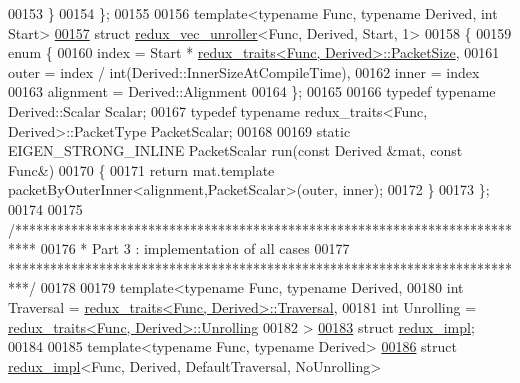 \begin{DoxyCode}
00153   \}
00154 \};
00155 
00156 \textcolor{keyword}{template}<\textcolor{keyword}{typename} Func, \textcolor{keyword}{typename} Derived, \textcolor{keywordtype}{int} Start>
\hyperlink{struct_eigen_1_1internal_1_1redux__vec__unroller_3_01_func_00_01_derived_00_01_start_00_011_01_4}{00157} \textcolor{keyword}{struct }\hyperlink{struct_eigen_1_1internal_1_1redux__vec__unroller}{redux\_vec\_unroller}<Func, Derived, Start, 1>
00158 \{
00159   \textcolor{keyword}{enum} \{
00160     index = Start * \hyperlink{struct_eigen_1_1internal_1_1redux__traits}{redux\_traits<Func, Derived>::PacketSize},
00161     outer = index / int(Derived::InnerSizeAtCompileTime),
00162     inner = index %
00163     alignment = Derived::Alignment
00164   \};
00165 
00166   \textcolor{keyword}{typedef} \textcolor{keyword}{typename} Derived::Scalar Scalar;
00167   \textcolor{keyword}{typedef} \textcolor{keyword}{typename} redux\_traits<Func, Derived>::PacketType PacketScalar;
00168 
00169   \textcolor{keyword}{static} EIGEN\_STRONG\_INLINE PacketScalar run(\textcolor{keyword}{const} Derived &mat, \textcolor{keyword}{const} Func&)
00170   \{
00171     \textcolor{keywordflow}{return} mat.template packetByOuterInner<alignment,PacketScalar>(outer, inner);
00172   \}
00173 \};
00174 
00175 \textcolor{comment}{/***************************************************************************}
00176 \textcolor{comment}{* Part 3 : implementation of all cases}
00177 \textcolor{comment}{***************************************************************************/}
00178 
00179 \textcolor{keyword}{template}<\textcolor{keyword}{typename} Func, \textcolor{keyword}{typename} Derived,
00180          \textcolor{keywordtype}{int} Traversal = \hyperlink{struct_eigen_1_1internal_1_1redux__traits}{redux\_traits<Func, Derived>::Traversal},
00181          \textcolor{keywordtype}{int} Unrolling = \hyperlink{struct_eigen_1_1internal_1_1redux__traits}{redux\_traits<Func, Derived>::Unrolling}
00182 >
\hyperlink{struct_eigen_1_1internal_1_1redux__impl}{00183} \textcolor{keyword}{struct }\hyperlink{struct_eigen_1_1internal_1_1redux__impl}{redux\_impl};
00184 
00185 \textcolor{keyword}{template}<\textcolor{keyword}{typename} Func, \textcolor{keyword}{typename} Derived>
\hyperlink{struct_eigen_1_1internal_1_1redux__impl_3_01_func_00_01_derived_00_01_default_traversal_00_01_no_unrolling_01_4}{00186} \textcolor{keyword}{struct }\hyperlink{struct_eigen_1_1internal_1_1redux__impl}{redux\_impl}<Func, Derived, DefaultTraversal, NoUnrolling>

\end{DoxyCode}
